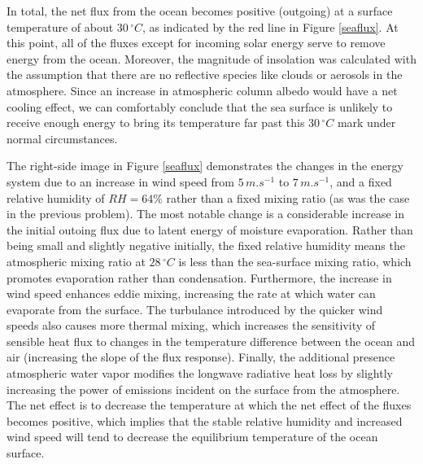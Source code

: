 \documentclass[12pt]{article}
\begin{document}
In total, the net flux from the ocean becomes positive (outgoing) at a surface temperature of about $30\,\si{^\circ C}$, as indicated by the red line in Figure \ref{seaflux}. At this point, all of the fluxes except for incoming solar energy serve to remove energy from the ocean. Moreover, the magnitude of insolation was calculated with the assumption that there are no reflective species like clouds or aerosols in the atmosphere. Since an increase in atmospheric column albedo would have a net cooling effect, we can comfortably conclude that the sea surface is unlikely to receive enough energy to bring its temperature far past this $30\,\si{^\circ C}$ mark under normal circumstances.

The right-side image in Figure \ref{seaflux} demonstrates the changes in the energy system due to an increase in wind speed from $5\,\si{m.s^{-1}}$ to $7\,\si{m.s^{-1}}$, and a fixed relative humidity of $RH=64\%$ rather than a fixed mixing ratio (as was the case in the previous problem). The most notable change is a considerable increase in the initial outoing flux due to latent energy of moisture evaporation. Rather than being small and slightly negative initially, the fixed relative humidity means the atmospheric mixing ratio at $28\,\si{^\circ C}$ is less than the sea-surface mixing ratio, which promotes evaporation rather than condensation. Furthermore, the increase in wind speed enhances eddie mixing, increasing the rate at which water can evaporate from the surface. The turbulance introduced by the quicker wind speeds also causes more thermal mixing, which increases the sensitivity of sensible heat flux to changes in the temperature difference between the ocean and air (increasing the slope of the flux response). Finally, the additional presence atmospheric water vapor modifies the longwave radiative heat loss by slightly increasing the power of emissions incident on the surface from the atmosphere. The net effect is to decrease the temperature at which the net effect of the fluxes becomes positive, which implies that the stable relative humidity and increased wind speed will tend to decrease the equilibrium temperature of the ocean surface.
\end{document}
